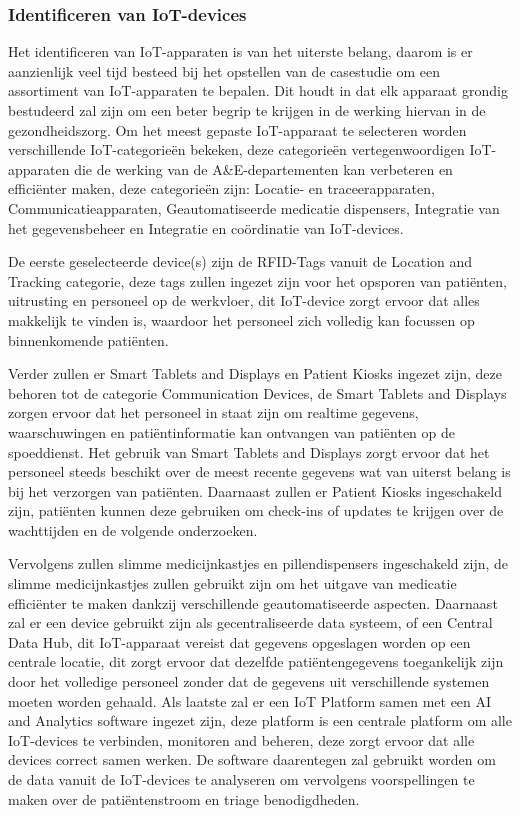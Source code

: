 \subsubsection*{Identificeren van IoT-devices}
Het identificeren van IoT-apparaten is van het uiterste belang, daarom is er aanzienlijk veel tijd besteed bij het opstellen van de casestudie om een assortiment van IoT-apparaten te bepalen. Dit houdt in dat elk apparaat grondig bestudeerd zal zijn om een beter begrip te krijgen in de werking hiervan in de gezondheidszorg. Om het meest gepaste IoT-apparaat te selecteren worden verschillende IoT-categorieën bekeken, deze categorieën vertegenwoordigen IoT-apparaten die de werking van de A\&E-departementen kan verbeteren en efficiënter maken, deze categorieën zijn: Locatie- en traceerapparaten, Communicatieapparaten, Geautomatiseerde medicatie dispensers, Integratie van het gegevensbeheer en Integratie en coördinatie van IoT-devices.

De eerste geselecteerde device(s) zijn de RFID-Tags vanuit de Location and Tracking categorie, deze tags zullen ingezet zijn voor het opsporen van patiënten, uitrusting en personeel op de werkvloer, dit IoT-device zorgt ervoor dat alles makkelijk te vinden is, waardoor het personeel zich volledig kan focussen op binnenkomende patiënten.

Verder zullen er Smart Tablets and Displays en Patient Kiosks ingezet zijn, deze behoren tot de categorie Communication Devices, de Smart Tablets and Displays zorgen ervoor dat het personeel in staat zijn om realtime gegevens, waarschuwingen en patiëntinformatie kan ontvangen van patiënten op de spoeddienst. Het gebruik van Smart Tablets and Displays zorgt ervoor dat het personeel steeds beschikt over de meest recente gegevens wat van uiterst belang is bij het verzorgen van patiënten. Daarnaast zullen er Patient Kiosks ingeschakeld zijn, patiënten kunnen deze gebruiken om check-ins of updates te krijgen over de wachttijden en de volgende onderzoeken.

Vervolgens zullen slimme medicijnkastjes en pillendispensers ingeschakeld zijn, de slimme medicijnkastjes zullen gebruikt zijn om het uitgave van medicatie efficiënter te maken dankzij verschillende geautomatiseerde aspecten. Daarnaast zal er een device gebruikt zijn als gecentraliseerde data systeem, of een Central Data Hub, dit IoT-apparaat vereist dat gegevens opgeslagen worden op een centrale locatie, dit zorgt ervoor dat dezelfde patiëntengegevens toegankelijk zijn door het volledige personeel zonder dat de gegevens uit verschillende systemen moeten worden gehaald. Als laatste zal er een IoT Platform samen met een AI and Analytics software ingezet zijn, deze platform is een centrale platform om alle IoT-devices te verbinden, monitoren and beheren, deze zorgt ervoor dat alle devices correct samen werken. De software daarentegen zal gebruikt worden om de data vanuit de IoT-devices te analyseren om vervolgens voorspellingen te maken over de patiëntenstroom en triage benodigdheden.


